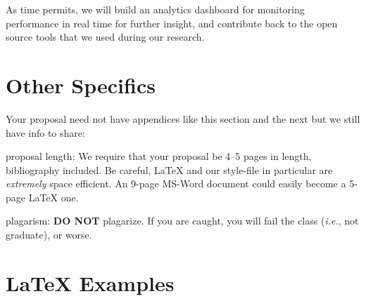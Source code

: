 \documentclass{sig-alternate}
\begin{document}
As time permits, we will build an analytics dashboard for monitoring performance in real time for further insight, and contribute back to the open source tools that we used during our research.


\vspace{175pt}

\appendix
\section{Other Specifics}
\label{app:other_specifics}
Your proposal need not have appendices like this section and the next
but we still have info to share:


\begin{enumerate*}
\item {\sc proposal length}: We require that your proposal be 4--5
  pages in length, bibliography included. Be careful, \LaTeX{} and our
  style-file in particular are \textit{extremely} space efficient. An
  9-page MS-Word document could easily become a 5-page \LaTeX{}
  one.\vspace{5pt}

\item {\sc plagarism}: \textbf{DO NOT} plagarize. If you are caught,
  you will fail the class (\textit{i.e.}, not graduate), or worse.

\end{enumerate*}

\section{\LaTeX{} Examples}
\label{app:latex_examples}
\end{document}
